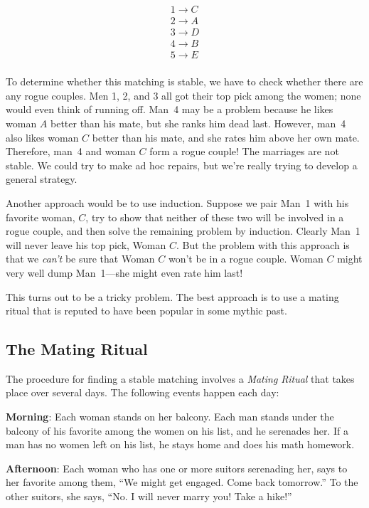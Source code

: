 \begin{eqnarray*}
1 \rightarrow C \\
2 \rightarrow A \\
3 \rightarrow D \\
4 \rightarrow B \\
5 \rightarrow E \\
\end{eqnarray*}

To determine whether this matching is stable, we have to check whether
there are any rogue couples.  Men 1, 2, and 3 all got their top pick
among the women; none would even think of running off.  Man~4 may be a
problem because he likes woman $A$ better than his mate, but she ranks him
dead last.  However, man~4 also likes woman $C$ better than his mate, and
she rates him above her own mate.  Therefore, man~4 and woman $C$ form a
rogue couple!  The marriages are not stable.  We could try to make ad hoc
repairs, but we're really trying to develop a general strategy.

Another approach would be to use induction.  Suppose we pair Man~1
with his favorite woman, $C$, try to show that neither of these two
will be involved in a rogue couple, and then solve the remaining
problem by induction.  Clearly Man~1 will never leave his top pick,
Woman $C$.  But the problem with this approach is that we \emph{can't}
be sure that Woman $C$ won't be in a rogue couple.  Woman $C$ might very
well dump Man~1---she might even rate him last!

This turns out to be a tricky problem.  The best approach is to use a
mating ritual that is reputed to have been popular in some mythic past.
\fi

\subsection{The Mating Ritual}

The procedure for finding a stable matching involves a \emph{Mating
Ritual} that takes place over several days.  The following events happen
each day:

\textbf{Morning}: Each woman stands on her balcony.  Each man stands
under the balcony of his favorite among the women on his list, and he
serenades her.  If a man has no women left on his list, he stays home
and does his math homework.

\textbf{Afternoon}: Each woman who has one or more suitors serenading
her, says to her favorite among them, ``We might get engaged.  Come
back tomorrow.''  To the other suitors, she says, ``No.  I will never
marry you!  Take a hike!''

